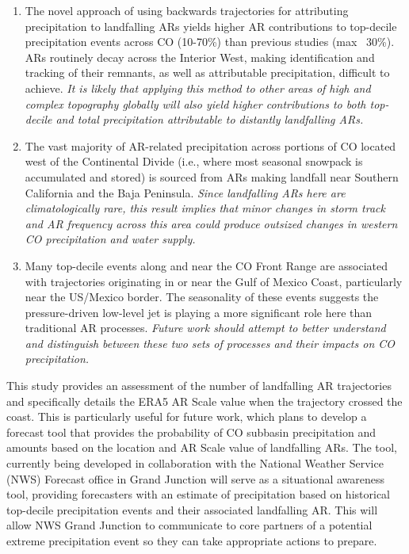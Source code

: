 \documentclass[draft]{agujournal2019}
\begin{document}
\begin{enumerate}
  \item The novel approach of using backwards trajectories for attributing precipitation to landfalling ARs yields higher AR contributions to top-decile precipitation events across CO (10-70\%) than previous studies (max ~30\%). ARs routinely decay across the Interior West, making identification and tracking of their remnants, as well as attributable precipitation, difficult to achieve. \textit{It is likely that applying this method to other areas of high and complex topography globally will also yield higher contributions to both top-decile and total precipitation attributable to distantly landfalling ARs.}
  \item The vast majority of AR-related precipitation across portions of CO located west of the Continental Divide (i.e., where most seasonal snowpack is accumulated and stored) is sourced from ARs making landfall near Southern California and the Baja Peninsula. \textit{Since landfalling ARs here are climatologically rare, this result implies that minor changes in storm track and AR frequency across this area could produce outsized changes in western CO precipitation and water supply.}
  \item Many top-decile events along and near the CO Front Range are associated with trajectories originating in or near the Gulf of Mexico Coast, particularly near the US/Mexico border. The seasonality of these events suggests the pressure-driven low-level jet is playing a more significant role here than traditional AR processes. \textit{Future work should attempt to better understand and distinguish between these two sets of processes and their impacts on CO precipitation.}
\end{enumerate}

This study provides an assessment of the number of landfalling AR trajectories and specifically details the ERA5 AR Scale \cite{MartinRalph2019} value when the trajectory crossed the coast. This is particularly useful for future work, which plans to develop a forecast tool that provides the probability of CO subbasin precipitation and amounts based on the location and AR Scale value of landfalling ARs. The tool, currently being developed in collaboration with the National Weather Service (NWS) Forecast office in Grand Junction will serve as a situational awareness tool, providing forecasters with an estimate of precipitation based on historical top-decile precipitation events and their associated landfalling AR. This will allow NWS Grand Junction to communicate to core partners of a potential extreme precipitation event so they can take appropriate actions to prepare.
\end{document}

